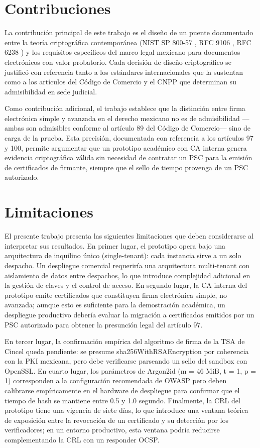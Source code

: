 \section{Contribuciones}\label{sec:contribuciones}

La contribución principal de este trabajo es el diseño de un puente documentado entre la teoría criptográfica contemporánea (NIST SP 800-57 \cite{barker2020}, RFC 9106 \cite{biryukov2021}, RFC 6238 \cite{mraihi2011}) y los requisitos específicos del marco legal mexicano para documentos electrónicos con valor probatorio. Cada decisión de diseño criptográfico se justificó con referencia tanto a los estándares internacionales que la sustentan como a los artículos del Código de Comercio y el CNPP que determinan su admisibilidad en sede judicial.

Como contribución adicional, el trabajo establece que la distinción entre firma electrónica simple y avanzada en el derecho mexicano no es de admisibilidad —ambas son admisibles conforme al artículo 89 del Código de Comercio— sino de carga de la prueba. Esta precisión, documentada con referencia a los artículos 97 y 100, permite argumentar que un prototipo académico con CA interna genera evidencia criptográfica válida sin necesidad de contratar un PSC para la emisión de certificados de firmante, siempre que el sello de tiempo provenga de un PSC autorizado.

\section{Limitaciones}\label{sec:limitaciones}

El presente trabajo presenta las siguientes limitaciones que deben considerarse al interpretar sus resultados. En primer lugar, el prototipo opera bajo una arquitectura de inquilino único (single-tenant): cada instancia sirve a un solo despacho. Un despliegue comercial requeriría una arquitectura multi-tenant con aislamiento de datos entre despachos, lo que introduce complejidad adicional en la gestión de claves y el control de acceso. En segundo lugar, la CA interna del prototipo emite certificados que constituyen firma electrónica simple, no avanzada; aunque esto es suficiente para la demostración académica, un despliegue productivo debería evaluar la migración a certificados emitidos por un PSC autorizado para obtener la presunción legal del artículo 97.

En tercer lugar, la confirmación empírica del algoritmo de firma de la TSA de Cincel queda pendiente: se presume sha256WithRSAEncryption por coherencia con la PKI mexicana, pero debe verificarse parseando un sello del sandbox con OpenSSL. En cuarto lugar, los parámetros de Argon2id (m = 46 MiB, t = 1, p = 1) corresponden a la configuración recomendada de OWASP \cite{owasp_pwstorage2024} pero deben calibrarse empíricamente en el hardware de despliegue para confirmar que el tiempo de hash se mantiene entre 0.5 y 1.0 segundo. Finalmente, la CRL del prototipo tiene una vigencia de siete días, lo que introduce una ventana teórica de exposición entre la revocación de un certificado y su detección por los verificadores; en un entorno productivo, esta ventana podría reducirse complementando la CRL con un responder OCSP.

